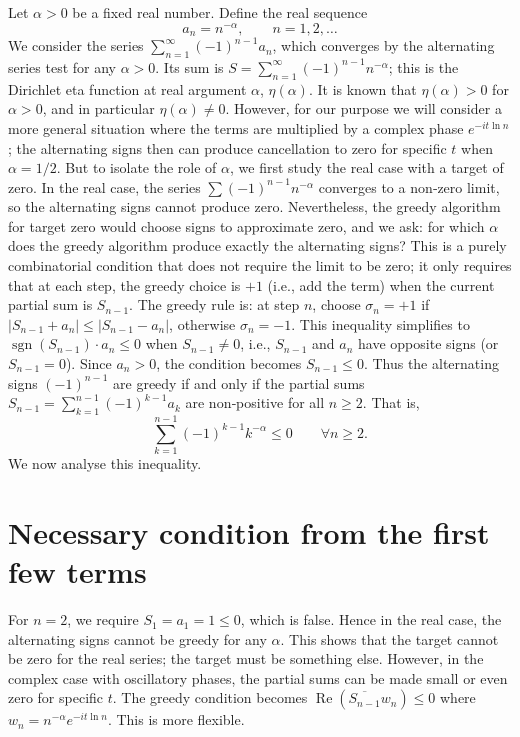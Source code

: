 \documentclass[12pt,a4paper]{article}
\begin{document}
Let $\alpha > 0$ be a fixed real number. Define the real sequence
\[
a_n = n^{-\alpha}, \qquad n=1,2,\dots
\]
We consider the series $\sum_{n=1}^\infty (-1)^{n-1} a_n$, which converges by the alternating series test for any $\alpha>0$. Its sum is $S = \sum_{n=1}^\infty (-1)^{n-1} n^{-\alpha}$; this is the Dirichlet eta function at real argument $\alpha$, $\eta(\alpha)$. It is known that $\eta(\alpha) > 0$ for $\alpha>0$, and in particular $\eta(\alpha) \neq 0$. However, for our purpose we will consider a more general situation where the terms are multiplied by a complex phase $e^{-i t \ln n}$; the alternating signs then can produce cancellation to zero for specific $t$ when $\alpha=1/2$. But to isolate the role of $\alpha$, we first study the real case with a target of zero. In the real case, the series $\sum (-1)^{n-1} n^{-\alpha}$ converges to a non‑zero limit, so the alternating signs cannot produce zero. Nevertheless, the greedy algorithm for target zero would choose signs to approximate zero, and we ask: for which $\alpha$ does the greedy algorithm produce exactly the alternating signs? This is a purely combinatorial condition that does not require the limit to be zero; it only requires that at each step, the greedy choice is $+1$ (i.e., add the term) when the current partial sum is $S_{n-1}$. The greedy rule is: at step $n$, choose $\sigma_n = +1$ if $|S_{n-1} + a_n| \le |S_{n-1} - a_n|$, otherwise $\sigma_n = -1$. This inequality simplifies to $\operatorname{sgn}(S_{n-1}) \cdot a_n \le 0$ when $S_{n-1} \neq 0$, i.e., $S_{n-1}$ and $a_n$ have opposite signs (or $S_{n-1}=0$). Since $a_n > 0$, the condition becomes $S_{n-1} \le 0$. Thus the alternating signs $(-1)^{n-1}$ are greedy if and only if the partial sums $S_{n-1} = \sum_{k=1}^{n-1} (-1)^{k-1} a_k$ are non‑positive for all $n\ge2$. That is,
\[
\sum_{k=1}^{n-1} (-1)^{k-1} k^{-\alpha} \le 0 \qquad \forall n\ge2.
\]
We now analyse this inequality.

\section{Necessary condition from the first few terms}

For $n=2$, we require $S_1 = a_1 = 1 \le 0$, which is false. Hence in the real case, the alternating signs cannot be greedy for any $\alpha$. This shows that the target cannot be zero for the real series; the target must be something else. However, in the complex case with oscillatory phases, the partial sums can be made small or even zero for specific $t$. The greedy condition becomes $\operatorname{Re}(\overline{S_{n-1}} w_n) \le 0$ where $w_n = n^{-\alpha} e^{-i t \ln n}$. This is more flexible.
\end{document}
